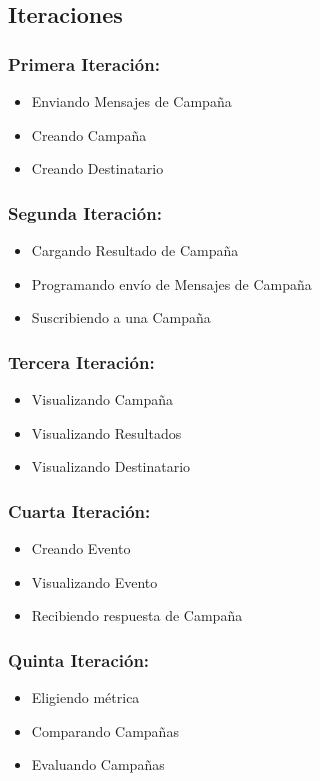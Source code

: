 \documentclass[a4paper, 11pt]{article}
\begin{document}
\subsection{Iteraciones}
\subsubsection{Primera Iteraci\'on:}
\begin{itemize}
\item Enviando Mensajes de Campaña
\item Creando Campaña
\item Creando Destinatario
\end{itemize}

\subsubsection{Segunda Iteraci\'on:}
\begin{itemize}
\item Cargando Resultado de Campaña
\item Programando envío de Mensajes de Campaña
\item Suscribiendo a una Campaña
\end{itemize}


\subsubsection{Tercera Iteraci\'on:}
\begin{itemize}
\item Visualizando Campaña
\item Visualizando Resultados
\item Visualizando Destinatario
\end{itemize}


\subsubsection{Cuarta Iteraci\'on:}
\begin{itemize}
\item Creando Evento
\item Visualizando Evento
\item Recibiendo respuesta de Campaña
\end{itemize}


\subsubsection{Quinta Iteraci\'on:}
\begin{itemize}
\item Eligiendo métrica
\item Comparando Campañas
\item Evaluando Campañas
\end{itemize}
\end{document}
